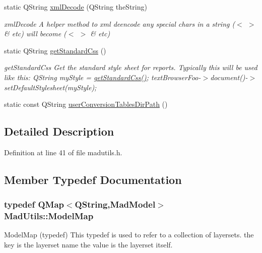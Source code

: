 \begin{DoxyCompactItemize}
static Q\-String \hyperlink{class_mad_utils_aee37612e0cc8aeafe2614b018e5d2c4d}{xml\-Decode} (Q\-String the\-String)
\begin{DoxyCompactList}\small\item\em xml\-Decode A helper method to xml deencode any special chars in a string ($<$ $>$ \& etc) will become ($<$ $>$ \& etc) \end{DoxyCompactList}\item 
static Q\-String \hyperlink{class_mad_utils_ac633dc293b02664fe0246be01a3f448c}{get\-Standard\-Css} ()
\begin{DoxyCompactList}\small\item\em get\-Standard\-Css Get the standard style sheet for reports. Typically this will be used like this\-: Q\-String my\-Style = \hyperlink{class_mad_utils_ac633dc293b02664fe0246be01a3f448c}{get\-Standard\-Css()}; text\-Browser\-Foo-\/$>$document()-\/$>$set\-Default\-Stylesheet(my\-Style); \end{DoxyCompactList}\item 
static const Q\-String \hyperlink{class_mad_utils_add01d28ed02067656f7f20240c9b8213}{user\-Conversion\-Tables\-Dir\-Path} ()
\end{DoxyCompactItemize}


\subsection{Detailed Description}


Definition at line 41 of file madutils.\-h.



\subsection{Member Typedef Documentation}
\hypertarget{class_mad_utils_a6bec5016d103cb2712d7bd2001c55b3b}{
\subsubsection[{Model\-Map}]{\setlength{\rightskip}{0pt plus 5cm}typedef Q\-Map$<$Q\-String,{\bf Mad\-Model}$>$ {\bf Mad\-Utils\-::\-Model\-Map}}}\label{class_mad_utils_a6bec5016d103cb2712d7bd2001c55b3b}


Model\-Map (typedef) This typedef is used to refer to a collection of layersets. the key is the layerset name the value is the layerset itself. 



